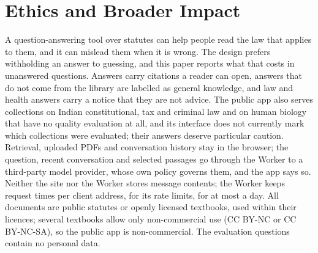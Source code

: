 \section{Ethics and Broader Impact}
\label{sec:ethics}

A question-answering tool over statutes can help people read the law that applies to them, and it can mislead them when it is wrong.
The design prefers withholding an answer to guessing, and this paper reports what that costs in unanswered questions.
Answers carry citations a reader can open, answers that do not come from the library are labelled as general knowledge, and law and health answers carry a notice that they are not advice.
The public app also serves collections on Indian constitutional, tax and criminal law and on human biology that have no quality evaluation at all, and its interface does not currently mark which collections were evaluated; their answers deserve particular caution.
Retrieval, uploaded PDFs and conversation history stay in the browser; the question, recent conversation and selected passages go through the Worker to a third-party model provider, whose own policy governs them, and the app says so. Neither the site nor the Worker stores message contents; the Worker keeps request times per client address, for its rate limits, for at most a day.
All documents are public statutes or openly licensed textbooks, used within their licences; several textbooks allow only non-commercial use (CC BY-NC or CC BY-NC-SA), so the public app is non-commercial. The evaluation questions contain no personal data.
